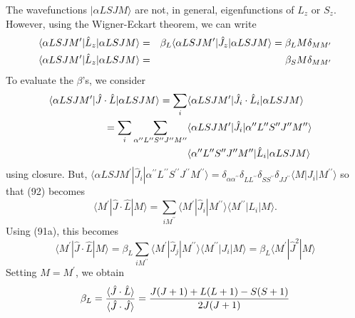 The wavefunctions $ | \alpha LSJM \rangle$ are not, in general, 
eigenfunctions of $L_z$ or $S_z$.  However, using the Wigner-Eckart 
theorem, we can write
\begin{eqnarray}
\langle \alpha LSJM^{\prime} | {\hat{L}}_z | \alpha LSJM \rangle &=& 
\beta_L \langle \alpha LSJM^{\prime} | {\hat{J}}_z | \alpha LSJM 
\rangle = \beta_L M \delta_{MM^{\prime}}\cr
\langle \alpha LSJM^{\prime} | {\hat{L}}_z | \alpha LSJM \rangle &=& 
\beta_S M \delta_{MM^{\prime}}
\label{chap16-eqno91}
\end{eqnarray}
To evaluate the $\beta$'s, we consider
\begin{eqnarray}
\langle \alpha LSJM^{\prime} | {\hat{J}} \cdot {\hat{L}} | \alpha 
LSJM \rangle = \sum_i & \langle \alpha LSJM^{\prime} | {\hat{J}}_i 
\cdot {\hat{L}}_i | \alpha LSJM \rangle\cr
= \sum_i \sum_{\alpha^{\prime \prime}L^{\prime \prime}S^{\prime \prime} 
J^{\prime \prime}M^{\prime \prime}} & \langle \alpha LSJM^{\prime} | 
{\hat{J}}_i | \alpha^{\prime \prime}L^{\prime \prime}S^{\prime \prime} 
J^{\prime \prime}M^{\prime \prime} \rangle\cr
& \langle \alpha^{\prime \prime}L^{\prime \prime}S^{\prime \prime} 
J^{\prime \prime}M^{\prime \prime} | {\hat{L}}_i | \alpha LSJM 
\rangle
\label{chap16-eqno92}
\end{eqnarray}
using closure.  But, $\langle \alpha LSJM^{\prime} | {\hat{J}}_i |
\alpha^{\prime \prime}L^{\prime \prime}S^{\prime \prime} 
J^{\prime \prime}M^{\prime \prime} \rangle = \delta_{\alpha 
\alpha^{\prime\prime}} \delta_{LL^{\prime\prime}} 
\delta_{SS^{\prime\prime}} \delta_{JJ^{\prime\prime}} \langle M | 
J_i | M^{\prime\prime} \rangle$ so that (92) becomes
\begin{equation}
\langle M^{\prime} | {\hat{J}} \cdot {\hat{L}} | M \rangle = 
\sum_{iM^{\prime\prime}} \langle M^{\prime} | {\hat{J}}_i | 
M^{\prime\prime} \rangle \langle M^{\prime\prime} | L_i | M \rangle.
\end{equation}
Using (91a), this becomes
\begin{equation}
\langle M^{\prime} | {\hat{J}} \cdot {\hat{L}} | M \rangle = \beta_L 
\sum_{iM^{\prime\prime}} \langle M^{\prime} | {\hat{J}}_j | 
M^{\prime\prime} \rangle \langle M^{\prime\prime} | J_i | M 
\rangle = \beta_L \langle M^{\prime} | {\hat{J}}^2 |  M \rangle
\end{equation}
Setting $M = M^{\prime}$, we obtain
\begin{equation}
\beta_L = {\langle {\hat{J}} \cdot {\hat{L}} \rangle \over 
\langle {\hat{J}} \cdot {\hat{J}} \rangle} = {J(J+1)+L(L+1)-S(S+1) 
\over 2J(J+1)}
\end{equation}
